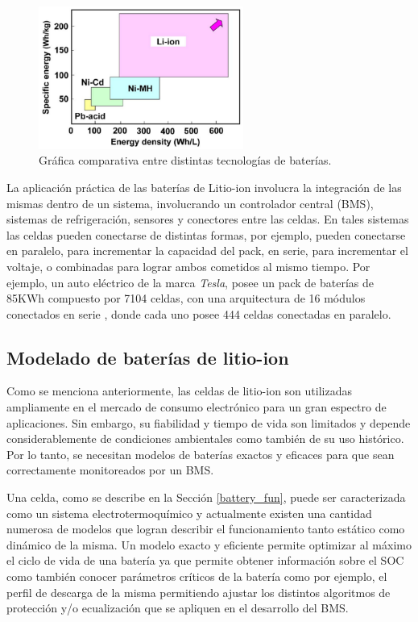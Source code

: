 \documentclass[10pt,a4paper]{article}
\begin{document}
\begin{figure}[h!]
    \begin{center}
	\includegraphics[width=0.6\textwidth]{comparisson-liion.png}
	\caption{Gr\'afica comparativa entre distintas tecnologías de baterías.}
	\label{comparisson_batt}
    \end{center}
\end{figure}

\noindent La aplicación práctica de las baterías de Litio-ion involucra la
integración de las mismas dentro de un sistema, involucrando un controlador
central (\acrshort{BMS}), sistemas de refrigeración, sensores y conectores entre
las celdas. En tales sistemas las celdas pueden conectarse de distintas formas,
por ejemplo, pueden conectarse en paralelo, para incrementar la capacidad del
pack, en serie, para incrementar el voltaje, o combinadas para lograr ambos
cometidos al mismo tiempo. Por ejemplo, un auto eléctrico de la marca
\emph{Tesla}, posee un pack de baterías de 85KWh compuesto por 7104 celdas, con
una arquitectura de 16 módulos conectados en serie , donde cada uno posee 444
celdas conectadas en paralelo.


\subsection{Modelado de bater\'ias de litio-ion}\label{litioModel}

\noindent Como se menciona anteriormente, las celdas de litio-ion son utilizadas
ampliamente en el mercado de consumo electr\'onico para un gran espectro de 
aplicaciones. Sin embargo, su fiabilidad y tiempo de vida son limitados y 
depende considerablemente de condiciones ambientales como también de su uso 
hist\'orico. Por lo tanto, se necesitan modelos de bater\'ias exactos y eficaces 
para que sean correctamente monitoreados por un \acrshort{BMS}.

\noindent Una celda, como se describe en la Secci\'on \ref{battery_fun}, puede 
ser caracterizada como un sistema electrotermoqu\'imico y actualmente existen 
una cantidad numerosa de modelos que logran describir el funcionamiento tanto 
est\'atico como din\'amico de la misma. Un modelo exacto y eficiente permite 
optimizar al m\'aximo el ciclo de vida de una bater\'ia ya que permite 
obtener informaci\'on sobre el \acrshort{SOC} como tambi\'en conocer 
par\'ametros cr\'iticos de la bater\'ia como por ejemplo, el perfil de descarga 
de la misma permitiendo ajustar los distintos algoritmos de protecci\'on y/o 
ecualizaci\'on que se apliquen en el desarrollo del \acrshort{BMS}.
\end{document}
